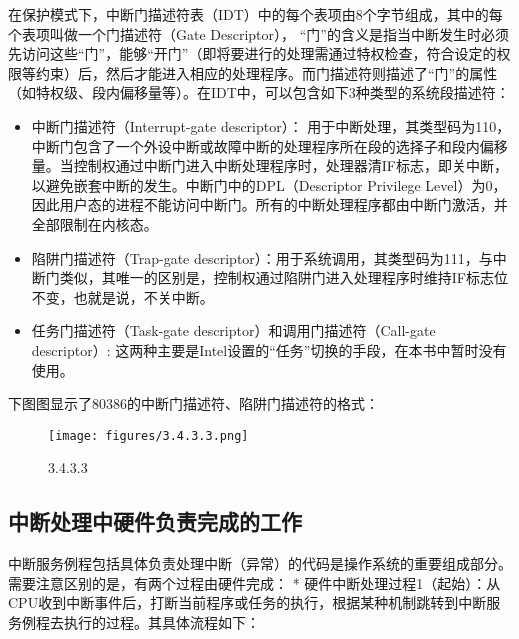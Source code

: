 在保护模式下，中断门描述符表（IDT）中的每个表项由8个字节组成，其中的每个表项叫做一个门描述符（Gate
Descriptor），
``门''的含义是指当中断发生时必须先访问这些``门''，能够``开门''（即将要进行的处理需通过特权检查，符合设定的权限等约束）后，然后才能进入相应的处理程序。而门描述符则描述了``门''的属性（如特权级、段内偏移量等）。在IDT中，可以包含如下3种类型的系统段描述符：

\begin{itemize}
\tightlist
\item
  中断门描述符（Interrupt-gate descriptor）：
  用于中断处理，其类型码为110，中断门包含了一个外设中断或故障中断的处理程序所在段的选择子和段内偏移量。当控制权通过中断门进入中断处理程序时，处理器清IF标志，即关中断，以避免嵌套中断的发生。中断门中的DPL（Descriptor
  Privilege
  Level）为0，因此用户态的进程不能访问中断门。所有的中断处理程序都由中断门激活，并全部限制在内核态。
\item
  陷阱门描述符（Trap-gate
  descriptor）：用于系统调用，其类型码为111，与中断门类似，其唯一的区别是，控制权通过陷阱门进入处理程序时维持IF标志位不变，也就是说，不关中断。
\item
  任务门描述符（Task-gate descriptor）和调用门描述符（Call-gate
  descriptor）:
  这两种主要是Intel设置的``任务''切换的手段，在本书中暂时没有使用。
\end{itemize}

下图图显示了80386的中断门描述符、陷阱门描述符的格式：

\begin{figure}[htbp]
\centering
\texttt{[image: figures/3.4.3.3.png]}
\caption{3.4.3.3}
\end{figure}

\subsection{中断处理中硬件负责完成的工作}\label{ux4e2dux65adux5904ux7406ux4e2dux786cux4ef6ux8d1fux8d23ux5b8cux6210ux7684ux5de5ux4f5c}

中断服务例程包括具体负责处理中断（异常）的代码是操作系统的重要组成部分。需要注意区别的是，有两个过程由硬件完成：
*
硬件中断处理过程1（起始）：从CPU收到中断事件后，打断当前程序或任务的执行，根据某种机制跳转到中断服务例程去执行的过程。其具体流程如下：

